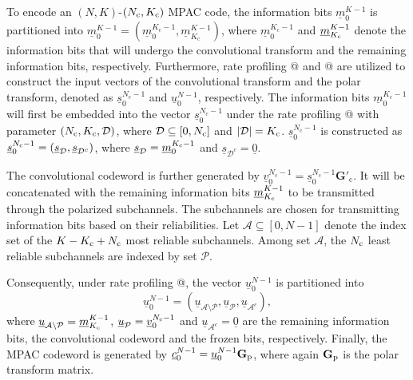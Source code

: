 \documentclass[12pt, draftclsnofoot, peerreview, onecolumn]{IEEEtran}
\makeatletter
\theoremstyle{noparent}
\newcommand{\Rmnum}[1]{\expandafter\@slowromancap\romannumeral #1@}
\makeatother
\begin{document}
To encode an $(N,K)$-$(N_{\rm c},K_{\rm c})$ MPAC code, 
the information bits $\underline{m}_{0}^{K-1}$ is partitioned into 
$\underline{m}_{0}^{K-1}=(\underline{m}_{0}^{K_{\mathrm c}-1}, \underline{m}_{K_{\mathrm c}}^{K-1})$,
where $\underline{m}_{0}^{K_{\mathrm c}-1}$ and $\underline{m}_{K_{\rm c}}^{K-1}$
denote the information bits that will undergo the convolutional transform and 
the remaining information bits, respectively.
Furthermore, rate profiling \Rmnum{1} and \Rmnum{2} are utilized
to construct the input vectors of the convolutional transform and 
the polar transform, denoted as $\underline{s}_{0}^{N_{\mathrm c}-1}$
and $\underline{u}_{0}^{N-1}$, respectively.
The information bits $\underline{m}_{0}^{K_{\mathrm c}-1}$
will first be embedded into the vector $\underline{s}_{0}^{N_{\mathrm c}-1}$
under the rate profiling \Rmnum{1} with parameter $(N_{\rm c},K_{\rm c},\mathcal{D})$,
where $\mathcal{D} \subseteq [0, N_{\rm c}]$ and $|\mathcal{D}|=K_{\rm c}$.
$\underline{s}_{0}^{N_{\mathrm c}-1}$ is constructed as
$\underline{s}_{0}^{N_{\rm c}-1}=(\underline{s}_{\mathcal{D}}, \underline{s}_{\mathcal{D}^c})$,
where $\underline{s}_{\mathcal{D}}=\underline{m}_{0}^{K_{\rm c}-1}$ and $\underline{s}_{\mathcal{D}^c}=\underline{0}$.

The convolutional codeword is further generated by 
$\underline{v}_{0}^{N_{\mathrm c}-1}=\underline{s}_{0}^{N_{\mathrm c}-1} \mathbf{G}'_{\mathrm{c}}$.
It will be concatenated with the remaining information bits $\underline{m}_{K_{\rm c}}^{K-1}$ to be 
transmitted through the polarized subchannels.
The subchannels are chosen for transmitting information bits based on their reliabilities.
Let $\mathcal{A} \subseteq [0, N-1]$ denote the index set of the 
$K-K_{\rm c}+N_{\rm c}$ most reliable subchannels.
Among set $\mathcal{A}$, the $N_{\rm c}$ least reliable subchannels
are indexed by set $\mathcal{P}$.

Consequently, under rate profiling \Rmnum{2}, the vector $\underline{u}_{0}^{N-1}$
is partitioned into 
\begin{equation}
    \underline{u}_{0}^{N-1} =(\underline{u}_{\mathcal{A}\setminus\mathcal{P}}, \underline{u}_{\mathcal{P}},\underline{u}_{\mathcal{A}^c}),
    \label{u_vector}
\end{equation}
where $\underline{u}_{\mathcal{A}\setminus \mathcal{P} }=\underline{m}_{K_{\rm c}}^{K-1}$, $\underline{u}_{\mathcal{P}}=\underline{v}_{0}^{N_{\rm c}-1}$
and $\underline{u}_{\mathcal{A}^c}=\underline{0}$ 
are the remaining information bits, 
the convolutional codeword and the frozen bits, respectively.
Finally, the MPAC codeword is generated by
$\underline{c}_{0}^{N-1}=\underline{u}_{0}^{N-1} \mathbf{G}_{\rm{p}}$, where again $\mathbf{G}_{\rm{p}}$ is the polar transform matrix.
\end{document}
